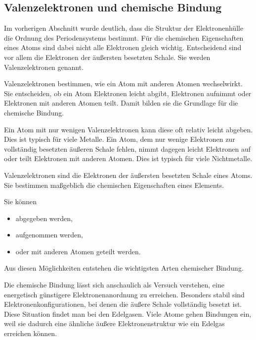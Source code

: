 \subsection{Valenzelektronen und chemische Bindung}
\label{subsec:valenzelektronen-chemische-bindung}

Im vorherigen Abschnitt wurde deutlich, dass die Struktur der Elektronenhülle
die Ordnung des Periodensystems bestimmt. Für die chemischen Eigenschaften
eines Atoms sind dabei nicht alle Elektronen gleich wichtig. Entscheidend sind
vor allem die Elektronen der äußersten besetzten Schale. Sie werden
Valenzelektronen genannt.

Valenzelektronen bestimmen, wie ein Atom mit anderen Atomen wechselwirkt. Sie
entscheiden, ob ein Atom Elektronen leicht abgibt, Elektronen aufnimmt oder
Elektronen mit anderen Atomen teilt. Damit bilden sie die Grundlage für die
chemische Bindung.

Ein Atom mit nur wenigen Valenzelektronen kann diese oft relativ leicht
abgeben. Dies ist typisch für viele Metalle. Ein Atom, dem nur wenige
Elektronen zur vollständig besetzten äußeren Schale fehlen, nimmt dagegen
leicht Elektronen auf oder teilt Elektronen mit anderen Atomen. Dies ist
typisch für viele Nichtmetalle.

\begin{PhysicsBox}[Valenzelektronen]
	\label{box:valenzelektronen}
	Valenzelektronen sind die Elektronen der äußersten besetzten Schale eines
	Atoms. Sie bestimmen maßgeblich die chemischen Eigenschaften eines Elements.
	
	Sie können
	\begin{itemize}
		\item abgegeben werden,
		\item aufgenommen werden,
		\item oder mit anderen Atomen geteilt werden.
	\end{itemize}
	
	Aus diesen Möglichkeiten entstehen die wichtigsten Arten chemischer Bindung.
\end{PhysicsBox}

Die chemische Bindung lässt sich anschaulich als Versuch verstehen, eine
energetisch günstigere Elektronenanordnung zu erreichen. Besonders stabil sind
Elektronenkonfigurationen, bei denen die äußere Schale vollständig besetzt ist.
Diese Situation findet man bei den Edelgasen. Viele Atome
gehen Bindungen ein, weil sie dadurch eine ähnliche äußere Elektronenstruktur
wie ein Edelgas erreichen können.

